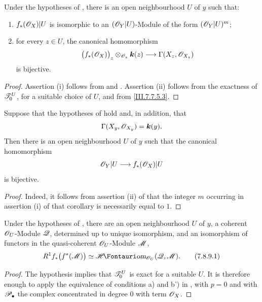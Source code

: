 \begin{corollary}[7.8.7]
\label{III.7.8.7}
Under the hypotheses of , there is an open
neighbourhood $U$ of $y$ such that:
\begin{enumerate}
  \item[(i)] $f_*(\mathscr{O}_X)|U$ is isomorphic to an
  $(\mathscr{O}_Y|U)$-Module of the form $(\mathscr{O}_Y|U)^m$;
  \item[(ii)] for every $z\in U$, the canonical
  homomorphism
  \[
    \bigl(f_*(\mathscr{O}_X)\bigr)_z
      \otimes_{\mathscr{O}_z}\boldsymbol{k}(z)
    \longrightarrow
    \Gamma(X_z,\mathscr{O}_{X_z})
  \]
  is bijective.
\end{enumerate}
\end{corollary}

\begin{proof}
Assertion (i) follows from  and
.  Assertion (ii) follows from the
exactness of $\mathscr{T}_0^U$, for a suitable choice of $U$,
and from \eqref{III.7.7.5.3}.
\end{proof}

\begin{corollary}[7.8.8]
\label{III.7.8.8}
Suppose that the hypotheses of  hold and,
in addition, that
\[
  \Gamma(X_y,\mathscr{O}_{X_y})=\boldsymbol{k}(y).
\]
Then there is an open neighbourhood $U$ of $y$ such that
the canonical homomorphism
\[
  \mathscr{O}_Y|U\longrightarrow f_*(\mathscr{O}_X)|U
\]
is bijective.
\end{corollary}

\begin{proof}
Indeed, it follows from assertion (ii) of
 that the integer $m$ occurring in
assertion (i) of that corollary is necessarily equal to
$1$.
\end{proof}

\begin{corollary}[7.8.9]
\label{III.7.8.9}
Under the hypotheses of , there are an open
neighbourhood $U$ of $y$, a coherent $\mathscr{O}_U$-Module
$\mathscr{Q}$, determined up to unique isomorphism, and an
isomorphism of functors in the quasi-coherent
$\mathscr{O}_U$-Module $\mathscr{M}$,
\[
  R^1f_*\bigl(f^*(\sh{M})\bigr)
  \simeq
  \shHom_{\sh{O}_U}(\sh{Q},\sh{M}).
  \tag{7.8.9.1}\label{III.7.8.9.1}
\]
\end{corollary}

\begin{proof}
The hypothesis implies that $\mathscr{T}_0^U$ is exact for a
suitable $U$.  It is therefore enough to apply the
equivalence of conditions a) and b') in
, with $p=0$ and with
$\mathscr{P}_\bullet$ the complex concentrated in degree $0$
with term $\mathscr{O}_X$.
\end{proof}

